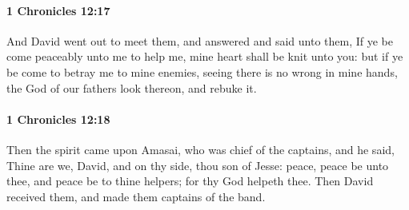 		\paragraph{1 Chronicles 12:17} %
			\label{1CHRONICLES-12-17}

			And David went out to meet them, and answered and said unto them, If ye be come peaceably unto me to help me, mine heart shall be knit unto you: but if ye be come to betray me to mine enemies, seeing there is no wrong in mine hands, the God of our fathers look thereon, and rebuke it.


		\paragraph{1 Chronicles 12:18} %
			\label{1CHRONICLES-12-18}

			Then the spirit came upon Amasai, who was chief of the captains, and he said, Thine are we, David, and on thy side, thou son of Jesse: peace, peace be unto thee, and peace be to thine helpers; for thy God helpeth thee. Then David received them, and made them captains of the band.

